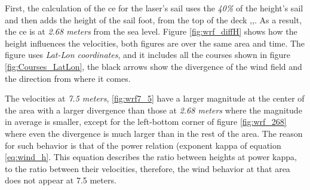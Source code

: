 First, the calculation of the \acrshort{ce} for the laser's sail uses the \textit{40\%} of the height's sail and then adds the height of the sail foot, from the top of the deck \cite{pennanen2015optimal},\cite{philpott1993yacht},\cite{claughton1998sailing}. %
As a result, the \acrshort{ce} is at \textit{2.68 meters} from the sea level.
Figure \ref{fig:wrf_diffH} shows how the height influences the velocities, both figures are over the same area and time. The figure uses \textit{Lat-Lon coordinates}, and it includes all the courses shown in figure \ref{fig:Courses_LatLon}, the black arrows show the divergence of the wind field and the direction from where it comes. \par  \noindent

The velocities at \textit{7.5 meters}, \ref{fig:wrf7_5} have a larger magnitude at the center of the area with a larger divergence than those at \textit{2.68 meters} where the magnitude in average is smaller, except for the left-bottom corner of figure \ref{fig:wrf_268} where even the divergence is much larger than in the rest of the area. The reason for such behavior is that of the power relation (exponent \acrshort{kappa} of equation \ref{eq:wind_h}. This equation describes the ratio between heights at power \acrshort{kappa}, to the ratio between their velocities, therefore, the wind behavior at that area does not appear at 7.5 meters. %

